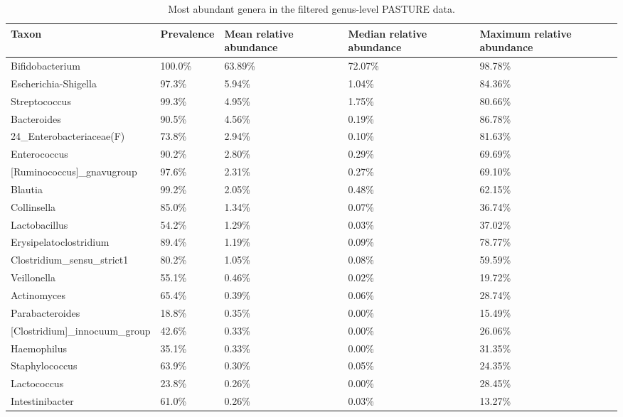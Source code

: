 \begin{table}[!h]
\centering
\caption{\label{tab:application:exploration-top-taxa}Most abundant genera in the filtered genus-level PASTURE data.}
\centering
\fontsize{8}{10}\selectfont
\begin{tabular}[t]{lllll}
\toprule
Taxon & Prevalence & Mean relative abundance & Median relative abundance & Maximum relative abundance\\
\midrule
Bifidobacterium & 100.0\% & 63.89\% & 72.07\% & 98.78\%\\
Escherichia-Shigella & 97.3\% & 5.94\% & 1.04\% & 84.36\%\\
Streptococcus & 99.3\% & 4.95\% & 1.75\% & 80.66\%\\
Bacteroides & 90.5\% & 4.56\% & 0.19\% & 86.78\%\\
24\_Enterobacteriaceae(F) & 73.8\% & 2.94\% & 0.10\% & 81.63\%\\
\addlinespace
Enterococcus & 90.2\% & 2.80\% & 0.29\% & 69.69\%\\
{}[Ruminococcus]\_gnavugroup & 97.6\% & 2.31\% & 0.27\% & 69.10\%\\
Blautia & 99.2\% & 2.05\% & 0.48\% & 62.15\%\\
Collinsella & 85.0\% & 1.34\% & 0.07\% & 36.74\%\\
Lactobacillus & 54.2\% & 1.29\% & 0.03\% & 37.02\%\\
\addlinespace
Erysipelatoclostridium & 89.4\% & 1.19\% & 0.09\% & 78.77\%\\
Clostridium\_sensu\_strict1 & 80.2\% & 1.05\% & 0.08\% & 59.59\%\\
Veillonella & 55.1\% & 0.46\% & 0.02\% & 19.72\%\\
Actinomyces & 65.4\% & 0.39\% & 0.06\% & 28.74\%\\
Parabacteroides & 18.8\% & 0.35\% & 0.00\% & 15.49\%\\
\addlinespace
{}[Clostridium]\_innocuum\_group & 42.6\% & 0.33\% & 0.00\% & 26.06\%\\
Haemophilus & 35.1\% & 0.33\% & 0.00\% & 31.35\%\\
Staphylococcus & 63.9\% & 0.30\% & 0.05\% & 24.35\%\\
Lactococcus & 23.8\% & 0.26\% & 0.00\% & 28.45\%\\
Intestinibacter & 61.0\% & 0.26\% & 0.03\% & 13.27\%\\
\bottomrule
\end{tabular}
\end{table}
